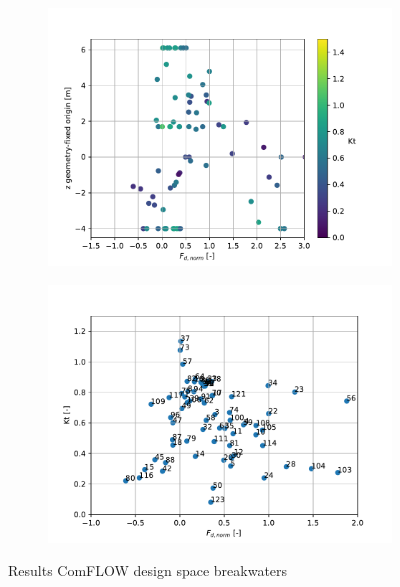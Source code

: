 \begin{figure}[h]
    \centering
    \begin{subfigure}[b]{0.49\textwidth}
        \centering
        \includegraphics[width=\linewidth]{figures/ComFLOW/Results moving/DI1/H3/Fd_norm_VS_top_bw_with_Kt.pdf}
        \caption[]%
        {{\small }}    
        \label{fig: Fd_norm_VS_top_bw_with_Kt DI1 H3 moving}
    \end{subfigure}
    \hfill
    \begin{subfigure}[b]{0.49\textwidth}  
        \centering 
        \includegraphics[width=\linewidth]{figures/ComFLOW/Results moving/DI1/H3/Fd_norm_VS_Kt.pdf}
        \caption[]%
        {{\small }}    
        \label{fig:  Fd_norm vs Kt DI1 H3 moving}
    \end{subfigure}
    
    \caption{Results ComFLOW design space breakwaters}
    \label{fig: }
\end{figure}



